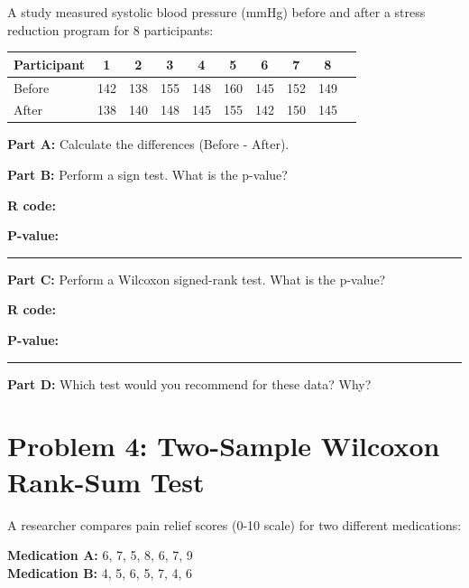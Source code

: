 \documentclass[11pt]{article}
\begin{document}
A study measured systolic blood pressure (mmHg) before and after a stress reduction program for 8 participants:

\begin{center}
\begin{tabular}{lccccccccc}
\toprule
Participant & 1 & 2 & 3 & 4 & 5 & 6 & 7 & 8 \\
\midrule
Before & 142 & 138 & 155 & 148 & 160 & 145 & 152 & 149 \\
After  & 138 & 140 & 148 & 145 & 155 & 142 & 150 & 145 \\
\bottomrule
\end{tabular}
\end{center}

\vspace{6pt}

\textbf{Part A:} Calculate the differences (Before - After).

\vspace{1.5cm}

\textbf{Part B:} Perform a sign test. What is the p-value?

\textbf{R code:}

\vspace{2.5cm}

\textbf{P-value:} \rule{3cm}{0.4pt}

\vspace{0.3cm}

\textbf{Part C:} Perform a Wilcoxon signed-rank test. What is the p-value?

\textbf{R code:}

\vspace{2.5cm}

\textbf{P-value:} \rule{3cm}{0.4pt}

\vspace{0.3cm}

\textbf{Part D:} Which test would you recommend for these data? Why?

\vspace{1.5cm}

\newpage

\section{Problem 4: Two-Sample Wilcoxon Rank-Sum Test}

A researcher compares pain relief scores (0-10 scale) for two different medications:

\begin{center}
\textbf{Medication A:} 6, 7, 5, 8, 6, 7, 9\\
\textbf{Medication B:} 4, 5, 6, 5, 7, 4, 6
\end{center}
\end{document}
